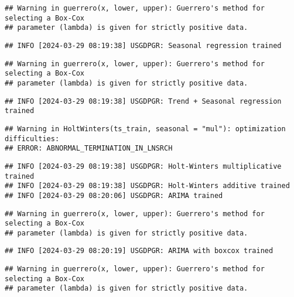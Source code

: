 \documentclass[
]{article}
\begin{document}
\begin{verbatim}
## Warning in guerrero(x, lower, upper): Guerrero's method for selecting a Box-Cox
## parameter (lambda) is given for strictly positive data.
\end{verbatim}

\begin{verbatim}
## INFO [2024-03-29 08:19:38] USGDPGR: Seasonal regression trained
\end{verbatim}

\begin{verbatim}
## Warning in guerrero(x, lower, upper): Guerrero's method for selecting a Box-Cox
## parameter (lambda) is given for strictly positive data.
\end{verbatim}

\begin{verbatim}
## INFO [2024-03-29 08:19:38] USGDPGR: Trend + Seasonal regression trained
\end{verbatim}

\begin{verbatim}
## Warning in HoltWinters(ts_train, seasonal = "mul"): optimization difficulties:
## ERROR: ABNORMAL_TERMINATION_IN_LNSRCH
\end{verbatim}

\begin{verbatim}
## INFO [2024-03-29 08:19:38] USGDPGR: Holt-Winters multiplicative trained
## INFO [2024-03-29 08:19:38] USGDPGR: Holt-Winters additive trained
## INFO [2024-03-29 08:20:06] USGDPGR: ARIMA trained
\end{verbatim}

\begin{verbatim}
## Warning in guerrero(x, lower, upper): Guerrero's method for selecting a Box-Cox
## parameter (lambda) is given for strictly positive data.
\end{verbatim}

\begin{verbatim}
## INFO [2024-03-29 08:20:19] USGDPGR: ARIMA with boxcox trained
\end{verbatim}

\begin{verbatim}
## Warning in guerrero(x, lower, upper): Guerrero's method for selecting a Box-Cox
## parameter (lambda) is given for strictly positive data.
\end{verbatim}
\end{document}

